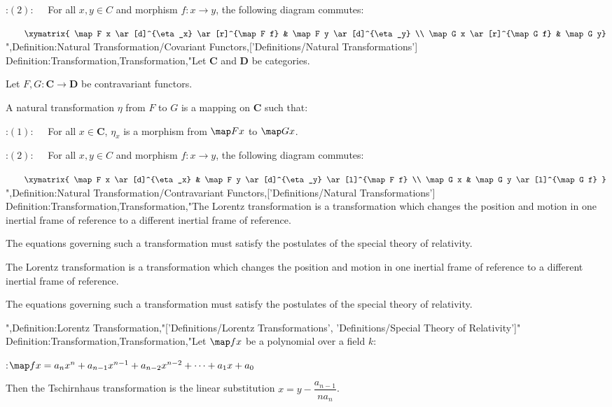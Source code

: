 :$(2): \quad$ For all $x, y \in C$ and morphism $f: x \to y$, the following diagram commutes:


$\quad \quad \xymatrix{
\map F x \ar[d]^{\eta_x} \ar[r]^{\map F f} & \map F y \ar[d]^{\eta_y} \\
\map G x \ar[r]^{\map G f}                 & \map G y}$",Definition:Natural Transformation/Covariant Functors,['Definitions/Natural Transformations']
Definition:Transformation,Transformation,"Let $\mathbf C$ and $\mathbf D$ be categories.

Let $F, G: \mathbf C \to \mathbf D$ be contravariant functors.


A natural transformation $\eta$ from $F$ to $G$ is a mapping on $\mathbf C$ such that:

:$(1): \quad$ For all $x \in \mathbf C$, $\eta_x$ is a morphism from $\map F x$ to $\map G x$.

:$(2): \quad$ For all $x, y \in C$ and morphism $f: x \to y$, the following diagram commutes:


$\quad \quad \xymatrix{
\map F x \ar[d]^{\eta_x} & \map F y \ar[d]^{\eta_y} \ar[l]^{\map F f}  \\
\map G x                 & \map G y \ar[l]^{\map G f} }$",Definition:Natural Transformation/Contravariant Functors,['Definitions/Natural Transformations']
Definition:Transformation,Transformation,"The Lorentz transformation is a transformation which changes the position and motion in one inertial frame of reference to a different inertial frame of reference.

The equations governing such a transformation must satisfy the postulates of the special theory of relativity.




The Lorentz transformation is a transformation which changes the position and motion in one inertial frame of reference to a different inertial frame of reference.

The equations governing such a transformation must satisfy the postulates of the special theory of relativity.



",Definition:Lorentz Transformation,"['Definitions/Lorentz Transformations', 'Definitions/Special Theory of Relativity']"
Definition:Transformation,Transformation,"Let $\map f x$ be a polynomial over a field $k$:

:$\map f x = a_n x^n + a_{n - 1} x^{n - 1} + a_{n - 2} x^{n - 2} + \cdots + a_1 x + a_0$


Then the Tschirnhaus transformation is the linear substitution $x = y - \dfrac {a_{n - 1} } {n a_n}$.

